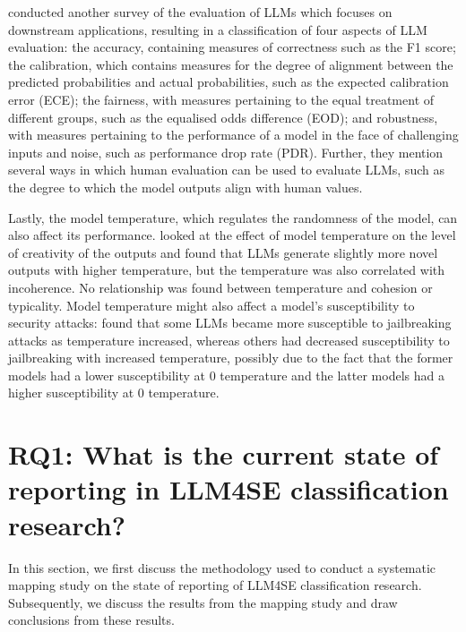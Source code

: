 \documentclass[a4paper]{article}
\begin{document}
\textcite{chang2023} conducted another survey of the evaluation of LLMs which focuses on downstream applications, resulting in a classification of four aspects of LLM evaluation: the accuracy, containing measures of correctness such as the F1 score; the calibration, which contains measures for the degree of alignment between the predicted probabilities and actual probabilities, such as the expected calibration error (ECE); the fairness, with measures pertaining to the equal treatment of different groups, such as the equalised odds difference (EOD); and robustness, with measures pertaining to the performance of a model in the face of challenging inputs and noise, such as performance drop rate (PDR). Further, they mention several ways in which human evaluation can be used to evaluate LLMs, such as the degree to which the model outputs align with human values.

Lastly, the model temperature, which regulates the randomness of the model, can also affect its performance. \textcite{peeperkorn2024} looked at the effect of model temperature on the level of creativity of the outputs and found that LLMs generate slightly more novel outputs with higher temperature, but the temperature was also correlated with incoherence. No relationship was found between temperature and cohesion or typicality. Model temperature might also affect a model's susceptibility to security attacks: \textcite{Yu2024} found that some LLMs became more susceptible to jailbreaking attacks as temperature increased, whereas others had decreased susceptibility to jailbreaking with increased temperature, possibly due to the fact that the former models had a lower susceptibility at 0 temperature and the latter models had a higher susceptibility at 0 temperature.


\section{RQ1: What is the current state of reporting in LLM4SE classification research?}
\label{RQ1}

In this section, we first discuss the methodology used to conduct a systematic mapping study on the state of reporting of LLM4SE classification research. Subsequently, we discuss the results from the mapping study and draw conclusions from these results.
\end{document}
